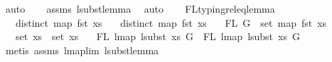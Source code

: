 \begin{isabellebody}
\ auto{\isacharbrackleft}{\kern0pt}{}{\isacharbrackright}{\kern0pt}\isanewline
\ \ \isamarkupfalse%
\ assms{\isacharparenleft}{\kern0pt}{}{\isacharcomma}{\kern0pt}{}{\isacharcomma}{\kern0pt}{}{\isacharcomma}{\kern0pt}{}{\isacharparenright}{\kern0pt}\ lsubst{\isacharunderscore}{\kern0pt}lemma{}\ \isamarkupfalse%
\ auto{\isacharbrackleft}{\kern0pt}{}{\isacharbrackright}{\kern0pt}\isanewline
\ \ \isamarkupfalse%
\isanewline
{}\isamarkupfalse%
%
\endisatagproof
{\isafoldproof}%
%
\isadelimproof
\isanewline
%
\endisadelimproof
\isanewline
\isanewline
\isanewline
{}\isamarkupfalse%
\ FL{\isacharunderscore}{\kern0pt}typing{\isacharunderscore}{\kern0pt}rel{\isacharunderscore}{\kern0pt}eq{\isacharunderscore}{\kern0pt}lemma{}{\isacharcolon}{\kern0pt}\isanewline
\ \ \ {\isachardoublequoteopen}distinct\ {\isacharparenleft}{\kern0pt}map\ fst\ xs{\isacharparenright}{\kern0pt}{\isachardoublequoteclose}\isanewline
\ \ \ {\isachardoublequoteopen}distinct\ {\isacharparenleft}{\kern0pt}map\ fst\ xs{}{\isacharparenright}{\kern0pt}{\isachardoublequoteclose}\isanewline
\ \ \ {\isachardoublequoteopen}FL\ G\ {\isacharequal}{\kern0pt}\ set\ {\isacharparenleft}{\kern0pt}map\ fst\ xs{}{\isacharparenright}{\kern0pt}{\isachardoublequoteclose}\isanewline
\ \ \ {\isachardoublequoteopen}set\ xs{}\ {\isasymsubseteq}\ set\ xs{\isachardoublequoteclose}\isanewline
\ \ \ {\isachardoublequoteopen}FL\ {\isacharparenleft}{\kern0pt}lmap\ {\isacharparenleft}{\kern0pt}lsubst\ xs{\isacharparenright}{\kern0pt}\ G{\isacharparenright}{\kern0pt}\ {\isacharequal}{\kern0pt}\ FL\ {\isacharparenleft}{\kern0pt}lmap\ {\isacharparenleft}{\kern0pt}lsubst\ xs{}{\isacharparenright}{\kern0pt}\ G{\isacharparenright}{\kern0pt}{\isachardoublequoteclose}\isanewline
%
\isadelimproof
%
\endisadelimproof
%
\isatagproof
{}\isamarkupfalse%
\ {\isacharparenleft}{\kern0pt}metis\ assms{\isacharparenleft}{\kern0pt}{}{\isacharcomma}{\kern0pt}{}{\isacharcomma}{\kern0pt}{}{\isacharcomma}{\kern0pt}{}{\isacharparenright}{\kern0pt}\ lmap{\isacharunderscore}{\kern0pt}lim\ lsubst{\isacharunderscore}{\kern0pt}lemma{}{\isacharparenright}{\kern0pt}%
\endisatagproof
{\isafoldproof}%
%
\isadelimproof
\isanewline
%

\end{isabellebody}
